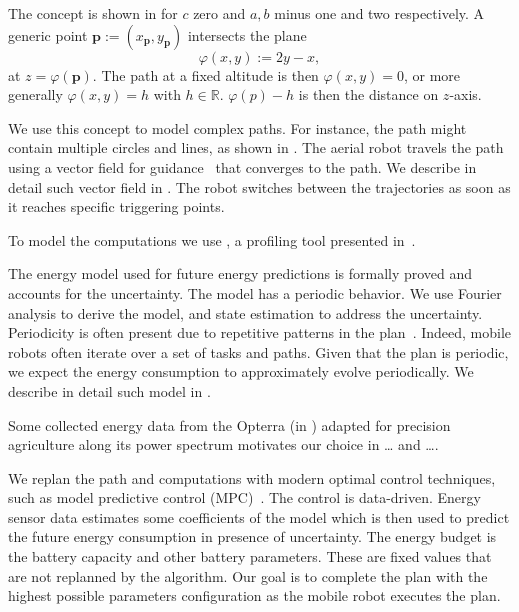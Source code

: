 The concept is shown in  for $c$ zero and $a,b$ minus one and two respectively. A generic point $\mathbf{p}:=(x_{\mathbf{p}},y_{\mathbf{p}})$ intersects the plane
\begin{equation}
  \varphi(x,y):=2y-x,
\end{equation}
at $z=\varphi(\mathbf{p})$. The path at a fixed altitude is then $\varphi(x,y)=0$, or more generally $\varphi(x,y)=h$ with $h\in\mathbb{R}$. $\varphi(p)-h$ is then the distance on $z$-axis.

We use this concept to model complex paths. For instance, the path might contain multiple circles and lines, as shown in . The aerial robot travels the path using a vector field for guidance~\citep{de2017guidance} that converges to the path. We describe in detail such vector field in . The robot switches between the trajectories as soon as it reaches specific triggering points. 

To model the computations we use \powprof{}, a profiling tool presented in~\citep{seewald2019coarse}. 

The energy model used for future energy predictions is formally proved and accounts for the uncertainty. The model has a periodic behavior. We use Fourier analysis to derive the model, and state estimation to address the uncertainty. Periodicity is often present due to repetitive patterns in the plan~\citep{seewald2020mechanical}. Indeed, mobile robots often iterate over a set of tasks and paths. Given that the plan is periodic, we expect the energy consumption to approximately evolve periodically. We describe in detail such model in . 

Some collected energy data from the Opterra (in ) adapted for precision agriculture along its power spectrum motivates our choice {\color{red}in \dots {} and \dots}. 

We replan the path and computations with modern optimal control techniques, such as model predictive control (MPC)~\citep{rawlings2017model}. The control is data-driven. Energy sensor data estimates some coefficients of the model which is then used to predict the future energy consumption in presence of uncertainty. The energy budget is the battery capacity and other battery parameters. These are fixed values that are not replanned by the algorithm. Our goal is to complete the plan with the highest possible parameters configuration as the mobile robot executes the plan. 

